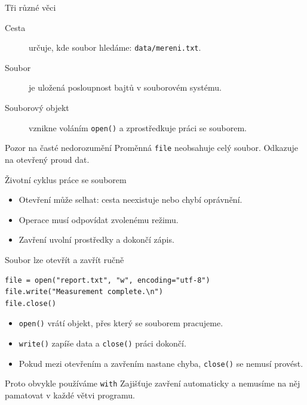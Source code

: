 \documentclass[aspectratio=169]{beamer}
\begin{document}
\begin{frame}{Tři různé věci}
  \begin{description}
    \item[Cesta] určuje, kde soubor hledáme: \texttt{data/mereni.txt}.
    \item[Soubor] je uložená posloupnost bajtů v souborovém systému.
    \item[Souborový objekt] vznikne voláním \texttt{open()} a zprostředkuje práci se souborem.
  \end{description}
  \begin{block}{Pozor na časté nedorozumění}
    Proměnná \texttt{file} neobsahuje celý soubor. Odkazuje na otevřený proud dat.
  \end{block}
\end{frame}

\begin{frame}{Životní cyklus práce se souborem}
  \centering
  \vspace{5mm}

  \begin{itemize}
    \item Otevření může selhat: cesta neexistuje nebo chybí oprávnění.
    \item Operace musí odpovídat zvolenému režimu.
    \item Zavření uvolní prostředky a dokončí zápis.
  \end{itemize}
\end{frame}

\begin{frame}[fragile]{Soubor lze otevřít a zavřít ručně}
\begin{lstlisting}[style=python]
file = open("report.txt", "w", encoding="utf-8")
file.write("Measurement complete.\n")
file.close()
\end{lstlisting}
  \begin{itemize}
    \item \texttt{open()} vrátí objekt, přes který se souborem pracujeme.
    \item \texttt{write()} zapíše data a \texttt{close()} práci dokončí.
    \item Pokud mezi otevřením a zavřením nastane chyba, \texttt{close()} se nemusí provést.
  \end{itemize}
  \begin{block}{Proto obvykle používáme \texttt{with}}
    Zajišťuje zavření automaticky a nemusíme na něj pamatovat v každé větvi programu.
  \end{block}
\end{frame}
\end{document}

